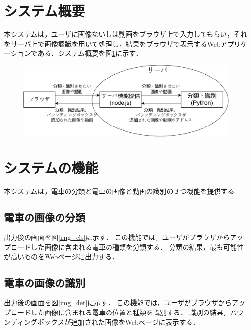 \begin{multicols*}{2}
\section{システム概要}
本システムは，ユーザに画像ないしは動画をブラウザ上で入力してもらい，それをサーバ上で画像認識を用いて処理し，結果をブラウザで表示するWebアプリケーションである．システム概要を図\ref{abc}に示す．
\begin{figure} %
	\label{abc}
	\centering
	\includegraphics[width=\linewidth]{obj/sys_gaiyou5.pdf}
\end{figure}

\section{システムの機能}
本システムは，電車の分類と電車の画像と動画の識別の３つ機能を提供する

\subsection{電車の画像の分類} 
出力後の画面を図\ref{img_cls}に示す．
この機能では，ユーザがブラウザからアップロードした画像に含まれる電車の種類を分類する． 分類の結果，最も可能性が高いものをWebページに出力する．
\subsection{電車の画像の識別}
出力後の画面を図\ref{img_det}に示す．
この機能では，ユーザがブラウザからアップロードした画像に含まれる電車の位置と種類を識別する．  識別の結果，バウンディングボックスが追加された画像をWebページに表示する．

\end{multicols*}

